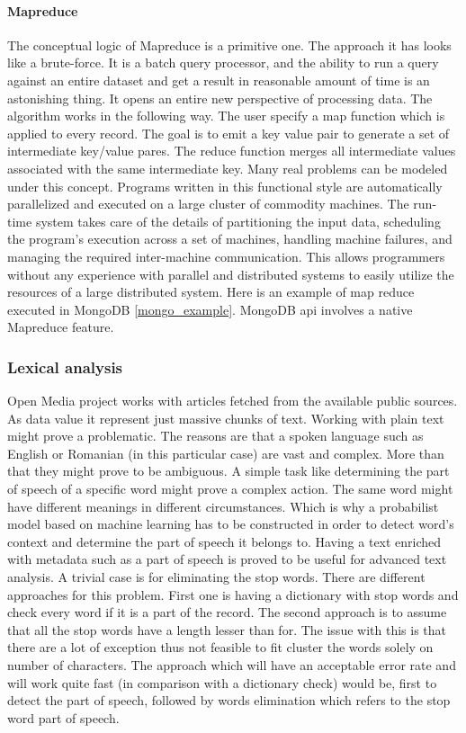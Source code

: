 \paragraph{Mapreduce}
The conceptual logic of Mapreduce is a primitive one. The approach it has looks like a brute-force. It is a batch query processor, and the ability to run a query against an entire dataset and get a result in reasonable amount of time is an astonishing thing. It opens an entire new perspective of processing data. The algorithm works in the following way. The user specify a map function which is applied to every record. The goal is to emit a key value pair to generate a set of intermediate key/value pares. The reduce function merges all intermediate values associated with the same intermediate key. Many real problems can be modeled under this concept. Programs written in this functional style are automatically parallelized and executed on a large cluster of commodity machines. The run-time system takes care of the details of partitioning the input data, scheduling the program’s execution across a set of machines, handling machine failures, and managing the required inter-machine communication. This allows programmers without any experience with parallel and distributed systems to easily utilize the resources of a large distributed system. Here is an example of map reduce executed in MongoDB \ref{mongo_example}. MongoDB api involves a native Mapreduce feature.



\subsubsection{Lexical analysis}
Open Media project works with articles fetched from the available public sources. As data value it represent just massive chunks of text. Working with plain text might prove a problematic. The reasons are that a spoken language such as English or Romanian (in this particular case) are vast and complex. More than that they might prove to be ambiguous. A simple task like determining the part of speech of a specific word might prove a complex action. The same word might have different meanings in different circumstances. Which is why a probabilist model based on machine learning has to be constructed in order to detect word's context and determine the part of speech it belongs to. Having a text enriched with metadata such as a part of speech is proved to be useful for advanced text analysis. A trivial case is for eliminating the stop words. There are different approaches for this problem. First one is having a dictionary with stop words and check every word if it is a part of the record. The second approach is to assume that all the stop words have a length lesser than for. The issue with this is that there are a lot of exception thus not feasible to fit cluster the words solely on number of characters. The approach which will have an acceptable error rate and will work quite fast (in comparison with a dictionary check) would be, first to detect the part of speech, followed by words elimination which refers to the stop word part of speech.

